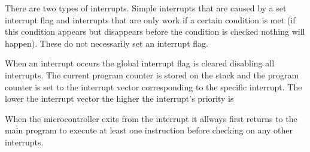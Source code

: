 There are two types of interrupts. Simple interrupts that are caused by a set 
interrupt flag and interrupts that are only work if a certain condition is met 
(if this condition appears but disappears before the condition is checked nothing 
will happen). These do not necessarily set an interrupt flag.

When an interrupt occurs the global interrupt flag is cleared disabling all 
interrupts. The current program counter is stored on the stack and the 
program counter is set to the interrupt vector corresponding to the specific 
interrupt. The lower the interrupt vector the higher the interrupt's priority is

When the microcontroller exits from the interrupt it allways first returns to the
main program to execute at least one instruction before checking on any other
interrupts.\cite[p.13-14]{ATMegaDS}
